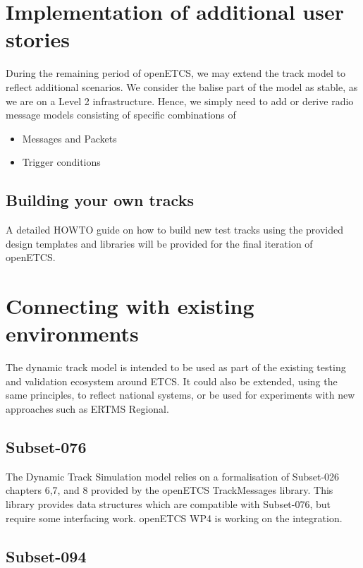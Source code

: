 \documentclass{template/openetcs_article}
\begin{document}
\section{Implementation of additional user stories}

During the remaining period of openETCS, we may extend the track model to reflect additional scenarios.
We consider the balise part of the model as stable, as we are on a Level 2 infrastructure.\newline
Hence, we simply need to add or derive radio message models consisting of specific combinations of
\begin{itemize}
 \item Messages and Packets
 \item Trigger conditions
\end{itemize}

\subsection{Building your own tracks}

A detailed HOWTO guide on how to build new test tracks using the provided design templates and libraries will be provided for the final iteration of openETCS.

\section{Connecting with existing environments}

The dynamic track model is intended to be used as part of the existing testing and validation ecosystem around ETCS.
It could also be extended, using the same principles, to reflect national systems, or be used for experiments with new approaches such as ERTMS Regional. 

\subsection{Subset-076}

The Dynamic Track Simulation model relies on a formalisation of Subset-026 chapters 6,7, and 8 provided by the openETCS TrackMessages library. This library provides data structures which are compatible with Subset-076, but require some interfacing work. openETCS WP4 is working on the integration.

\subsection{Subset-094}
\end{document}
